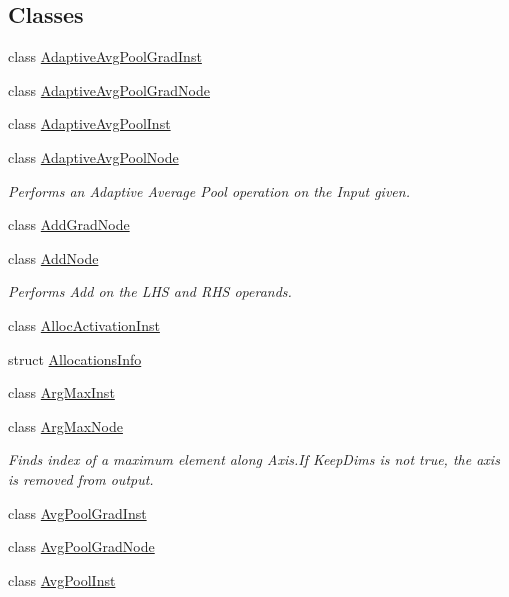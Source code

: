 \subsection*{Classes}
\begin{DoxyCompactItemize}
\item 
class \hyperlink{classglow_1_1_adaptive_avg_pool_grad_inst}{Adaptive\+Avg\+Pool\+Grad\+Inst}
\item 
class \hyperlink{classglow_1_1_adaptive_avg_pool_grad_node}{Adaptive\+Avg\+Pool\+Grad\+Node}
\item 
class \hyperlink{classglow_1_1_adaptive_avg_pool_inst}{Adaptive\+Avg\+Pool\+Inst}
\item 
class \hyperlink{classglow_1_1_adaptive_avg_pool_node}{Adaptive\+Avg\+Pool\+Node}
\begin{DoxyCompactList}\small\item\em Performs an Adaptive Average Pool operation on the Input given. \end{DoxyCompactList}\item 
class \hyperlink{classglow_1_1_add_grad_node}{Add\+Grad\+Node}
\item 
class \hyperlink{classglow_1_1_add_node}{Add\+Node}
\begin{DoxyCompactList}\small\item\em Performs Add on the L\+HS and R\+HS operands. \end{DoxyCompactList}\item 
class \hyperlink{classglow_1_1_alloc_activation_inst}{Alloc\+Activation\+Inst}
\item 
struct \hyperlink{structglow_1_1_allocations_info}{Allocations\+Info}
\item 
class \hyperlink{classglow_1_1_arg_max_inst}{Arg\+Max\+Inst}
\item 
class \hyperlink{classglow_1_1_arg_max_node}{Arg\+Max\+Node}
\begin{DoxyCompactList}\small\item\em Finds index of a maximum element along Axis.\+If Keep\+Dims is not true, the axis is removed from output. \end{DoxyCompactList}\item 
class \hyperlink{classglow_1_1_avg_pool_grad_inst}{Avg\+Pool\+Grad\+Inst}
\item 
class \hyperlink{classglow_1_1_avg_pool_grad_node}{Avg\+Pool\+Grad\+Node}
\item 
class \hyperlink{classglow_1_1_avg_pool_inst}{Avg\+Pool\+Inst}
\item 

\end{DoxyCompactItemize}
